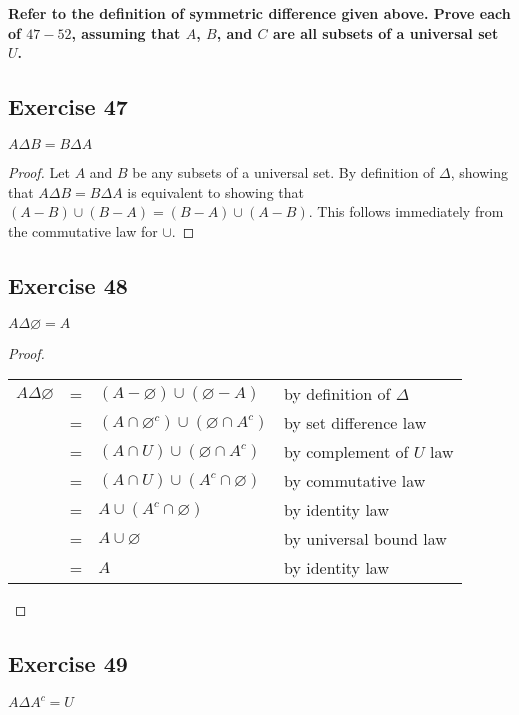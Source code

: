 \documentclass[14pt]{extarticle}
\newcommand{\es}{\varnothing}
\newcommand{\cy}{\color{cyan}}
\begin{document}
{\bf \cy Refer to the definition of symmetric difference given above. Prove each of $47-52$, assuming that $A$, $B$,
and $C$ are all subsets of a universal set $U$.}

\subsection{Exercise 47}
\(A \Delta B = B \Delta A\)

\begin{proof}
  Let $A$ and $B$ be any subsets of a universal set. By
  definition of $\Delta$, showing that \(A \Delta B = B
  \Delta A\) is equivalent to showing that \((A - B) \cup (B - A) = (B - A) \cup (A - B)\). This follows immediately
  from the commutative law for $\cup$.
\end{proof}

\subsection{Exercise 48}
\(A \Delta \es = A\)

\begin{proof}
  \begin{center}
    \begin{tabular}{rcll}
      \(A \Delta \es\) & = & \((A - \es) \cup (\es - A)\)           & {\cy by definition of $\Delta$} \\
                       & = & \((A \cap \es^c) \cup (\es \cap A^c)\) & {\cy by set difference law}     \\
                       & = & \((A \cap U) \cup (\es \cap A^c)\)     & {\cy by complement of $U$ law}  \\
                       & = & \((A \cap U) \cup (A^c \cap \es)\)     & {\cy by commutative law}        \\
                       & = & \(A \cup (A^c \cap \es)\)              & {\cy by identity law}           \\
                       & = & \(A \cup \es\)                         & {\cy by universal bound law}    \\
                       & = & \(A\)                                  & {\cy by identity law}
    \end{tabular}
  \end{center}
\end{proof}

\subsection{Exercise 49}
\(A \Delta A^c = U\)
\end{document}
